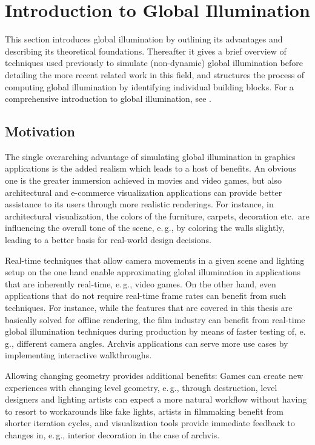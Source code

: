 \section{Introduction to Global Illumination}

This section introduces global illumination by outlining its advantages and describing its theoretical foundations. Thereafter it gives a brief overview of techniques used previously to simulate (non-dynamic) global illumination before detailing the more recent related work in this field, and structures the process of computing global illumination by identifying individual building blocks. For a comprehensive introduction to global illumination, see \citet{Ritschel:2012:GISTAR}.

\subsection{Motivation}
The single overarching advantage of simulating global illumination in graphics applications is the added realism which leads to a host of benefits. An obvious one is the greater immersion achieved in movies and video games, but also architectural and e-commerce visualization applications can provide better assistance to its users through more realistic renderings. For instance, in architectural visualization, the colors of the furniture, carpets, decoration etc.\ are influencing the overall tone of the scene, e.\,g., by coloring the walls slightly, leading to a better basis for real-world design decisions.

Real-time techniques that allow camera movements in a given scene and lighting setup on the one hand enable approximating global illumination in applications that are inherently real-time, e.\,g., video games. On the other hand, even applications that do not require real-time frame rates can benefit from such techniques. For instance, while the features that are covered in this thesis are basically solved for offline rendering, the film industry can benefit from real-time global illumination techniques during production by means of faster testing of, e.\,g., different camera angles. Archvis applications can serve more use cases by implementing interactive walkthroughs.

Allowing changing geometry provides additional benefits: Games can create new experiences with changing level geometry, e.\,g., through destruction, level designers and lighting artists can expect a more natural workflow without having to resort to workarounds like fake lights, artists in filmmaking benefit from shorter iteration cycles, and visualization tools provide immediate feedback to changes in, e.\,g., interior decoration in the case of archvis.


